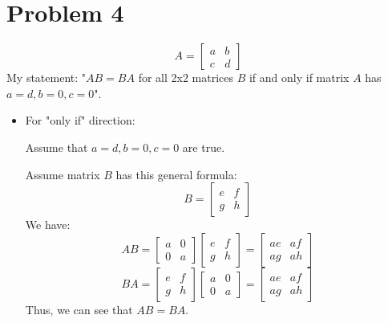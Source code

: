 \documentclass[10pt]{article}
\begin{document}
\section*{Problem 4}
\begin{equation*}
        A=
        \begin{bmatrix}
            a & b \\
            c & d
        \end{bmatrix}
    \end{equation*}
\noindent My statement: "$AB=BA$ for all 2x2 matrices $B$ if and only if matrix $A$ has $a=d, b=0, c=0$". \par
\begin{itemize}
    \item For "only if" direction: \par
    Assume that $a=d, b=0, c=0$ are true. \par
    Assume matrix $B$ has this general formula:
    \begin{equation*}
        B=
        \begin{bmatrix}
            e & f \\
            g & h
        \end{bmatrix}
    \end{equation*}
    We have:
    \begin{equation*}
        AB=
        \begin{bmatrix}
            a & 0 \\
            0 & a
        \end{bmatrix}
        \begin{bmatrix}
            e & f \\
            g & h
        \end{bmatrix}
        = 
        \begin{bmatrix}
            ae & af \\
            ag & ah
        \end{bmatrix}
    \end{equation*}
    \begin{equation*}
        BA=
        \begin{bmatrix}
            e & f \\
            g & h
        \end{bmatrix}
        \begin{bmatrix}
            a & 0 \\
            0 & a
        \end{bmatrix}
        =
        \begin{bmatrix}
            ae & af \\
            ag & ah
        \end{bmatrix}
    \end{equation*}
    Thus, we can see that $AB=BA$.
    

\end{itemize}
\end{document}
